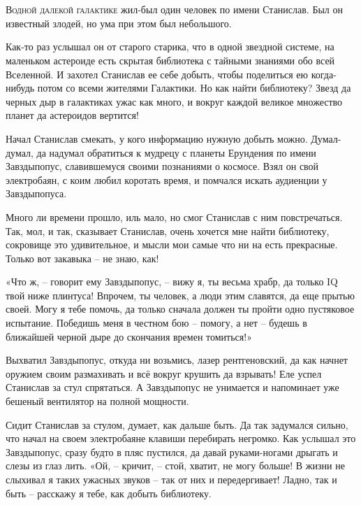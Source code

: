 \documentclass[ebook,oneside,final,openright]{memoir}
\begin{document}
\chapter{}
 \lettrine{В}{одной далекой галактике} жил-был один человек по имени Станислав. Был он известный злодей, но ума при этом был небольшого.\par
\par
Как-то раз услышал он от старого старика, что в одной звездной системе, на маленьком астероиде есть скрытая библиотека с тайными знаниями обо всей Вселенной. И захотел Станислав ее себе добыть, чтобы поделиться ею когда-нибудь потом со всеми жителями Галактики. Но как найти библиотеку? Звезд да черных дыр в галактиках ужас как много, и вокруг каждой великое множество планет да астероидов вертится!\par
\par
Начал Станислав смекать, у кого информацию нужную добыть можно. Думал-думал, да надумал обратиться к мудрецу с планеты Ерундения по имени Завздыпопус, славившемуся своими познаниями о космосе. Взял он свой электробаян, с коим любил коротать время, и помчался искать аудиенции у Завздыпопуса.\par
\par
Много ли времени прошло, иль мало, но смог Станислав с ним повстречаться. Так, мол, и так, сказывает Станислав, очень хочется мне найти библиотеку, сокровище это удивительное, и мысли мои самые что ни на есть прекрасные. Только вот закавыка – не знаю, как!\par
\par
«Что ж, – говорит ему Завздыпопус, – вижу я, ты весьма храбр, да только IQ твой ниже плинтуса! Впрочем, ты человек, а люди этим славятся, да еще прытью своей. Могу я тебе помочь, да только сначала должен ты пройти одно пустяковое испытание. Победишь меня в честном бою – помогу, а нет – будешь в ближайшей черной дыре до скончания времен томиться!» \par
\par
Выхватил Завздыпопус, откуда ни возьмись, лазер рентгеновский, да как начнет оружием своим размахивать и всё вокруг крушить да взрывать! Еле успел Станислав за стул спрятаться. А Завздыпопус не унимается и напоминает уже бешеный вентилятор на полной мощности. \par
\par
Сидит Станислав за стулом, думает, как дальше быть. Да так задумался сильно, что начал на своем электробаяне клавиши перебирать негромко. Как услышал это Завздыпопус, сразу будто в пляс пустился, да давай руками-ногами дрыгать и слезы из глаз лить. «Ой, – кричит, – стой, хватит, не могу больше! В жизни не слыхивал я таких ужасных звуков – так от них и передергивает! Ладно, так и быть – расскажу я тебе, как добыть библиотеку.\par
\end{document}
